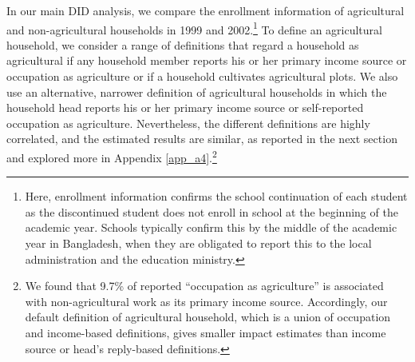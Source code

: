 \documentclass[12pt,letterpaper]{article}
\newcommand{\0}{\ensuremath{\mbox{\boldmath $0$}}}
\begin{document}
In our main DID analysis, we compare the enrollment information of agricultural and non-agricultural households in 1999 and 2002.\footnote{Here, enrollment information confirms the school continuation of each student as the discontinued student does not enroll in school at the beginning of the academic year. Schools typically confirm this by the middle of the academic year in Bangladesh, when they are obligated to report this to the local administration and the education ministry.} To define an agricultural household, we consider a range of definitions that regard a household as agricultural if any household member reports his or her primary income source or occupation as agriculture or if a household cultivates agricultural plots. We also use an alternative, narrower definition of agricultural households in which the household head reports his or her primary income source or self-reported occupation as agriculture. Nevertheless, the different definitions are highly correlated, and the estimated results are similar, as reported in the next section and explored more in Appendix \ref{app_a4}.\footnote{We found that 9.7\% of reported ``occupation as agriculture'' is associated with non-agricultural work as its primary income source. Accordingly, our default definition of agricultural household, which is a union of occupation and income-based definitions, gives smaller impact estimates than income source or head's reply-based definitions.}
\end{document}
